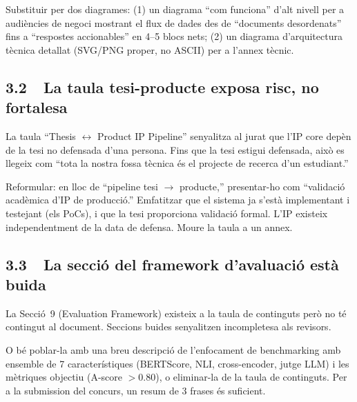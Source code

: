 \documentclass[11pt,a4paper]{article}
\begin{document}
\begin{fixbox}
Substituir per dos diagrames: (1) un diagrama ``com funciona'' d'alt nivell per a audiències de negoci mostrant el flux de dades des de ``documents desordenats'' fins a ``respostes accionables'' en 4--5 blocs nets; (2) un diagrama d'arquitectura tècnica detallat (SVG/PNG proper, no ASCII) per a l'annex tècnic.
\end{fixbox}

\subsection{3.2~~La taula tesi-producte exposa risc, no fortalesa}

\begin{issuebox}
La taula ``Thesis $\leftrightarrow$ Product IP Pipeline'' senyalitza al jurat que l'IP core depèn de la tesi no defensada d'una persona. Fins que la tesi estigui defensada, això es llegeix com ``tota la nostra fossa tècnica és el projecte de recerca d'un estudiant.''
\end{issuebox}

\begin{fixbox}
Reformular: en lloc de ``pipeline tesi $\rightarrow$ producte,'' presentar-ho com ``validació acadèmica d'IP de producció.'' Emfatitzar que el sistema ja s'està implementant i testejant (els PoCs), i que la tesi proporciona validació formal. L'IP existeix independentment de la data de defensa. Moure la taula a un annex.
\end{fixbox}

\subsection{3.3~~La secció del framework d'avaluació està buida}

\begin{issuebox}
La Secció~9 (Evaluation Framework) existeix a la taula de continguts però no té contingut al document. Seccions buides senyalitzen incompletesa als revisors.
\end{issuebox}

\begin{fixbox}
O bé poblar-la amb una breu descripció de l'enfocament de benchmarking amb ensemble de 7 característiques (BERTScore, NLI, cross-encoder, jutge LLM) i les mètriques objectiu (A-score $>$0.80), o eliminar-la de la taula de continguts. Per a la submission del concurs, un resum de 3 frases és suficient.
\end{fixbox}
\end{document}
